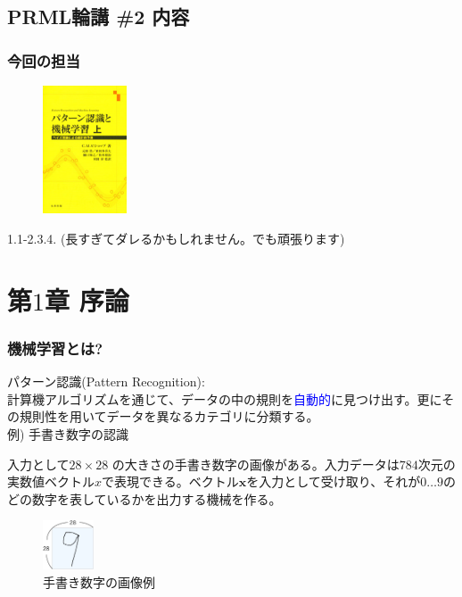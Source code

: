 \documentclass[dvipdfmx]{beamer}
\theoremstyle{definition}
\begin{document}
\subsection{PRML輪講 \#2 内容}
\begin{frame}
  \frametitle{今回の担当}
  \begin{figure}[htb]
    \centering
    \includegraphics[width=2.5cm,clip]{res/prml.eps}
  \end{figure}
  1.1-2.3.4. (長すぎてダレるかもしれません。でも頑張ります)
\end{frame}

\section{第$1$章 \enspace 序論}

\begin{frame}
  \frametitle{機械学習とは?}
  パターン認識(Pattern Recognition): \\ 計算機アルゴリズムを通じて、データの中の規則を\textcolor{blue}{自動的}に見つけ出す。更にその規則性を用いてデータを異なるカテゴリに分類する。
  \\
  例) 手書き数字の認識
   
  入力として$28 \times 28$ の大きさの手書き数字の画像がある。入力データは$784$次元の実数値ベクトル$x$で表現できる。ベクトル$\bm{x}$を入力として受け取り、それが$0 \ldots 9 $のどの数字を表しているかを出力する機械を作る。
  \begin{figure}[htb]
    \centering
    \includegraphics[width=1.5cm,clip]{res/handwritten.eps}
    \caption{手書き数字の画像例}
  \end{figure}
\end{frame}
\end{document}
